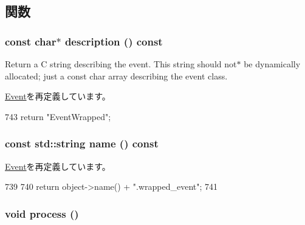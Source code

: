 \subsection{関数}
\hypertarget{classEventWrapper_a2bd90422eece9190794479e08092a252}{
\subsubsection[{description}]{\setlength{\rightskip}{0pt plus 5cm}const char$\ast$ description () const}}
\label{classEventWrapper_a2bd90422eece9190794479e08092a252}
Return a C string describing the event. This string should not$\ast$ be dynamically allocated; just a const char array describing the event class. 

\hyperlink{classEvent_a130ddddf003422b413e2e891b1b80e8f}{Event}を再定義しています。


\begin{DoxyCode}
743 { return "EventWrapped"; }
\end{DoxyCode}
\hypertarget{classEventWrapper_a6490f765a824ced1cc94979609fe7e07}{
\subsubsection[{name}]{\setlength{\rightskip}{0pt plus 5cm}const std::string name () const}}
\label{classEventWrapper_a6490f765a824ced1cc94979609fe7e07}


\hyperlink{classEvent_adbcff144e5e199d332a1352af1798148}{Event}を再定義しています。


\begin{DoxyCode}
739     {
740         return object->name() + ".wrapped_event";
741     }
\end{DoxyCode}
\hypertarget{classEventWrapper_a2e9c5136d19b1a95fc427e0852deab5c}{
\subsubsection[{process}]{\setlength{\rightskip}{0pt plus 5cm}void process ()}}
\label{classEventWrapper_a2e9c5136d19b1a95fc427e0852deab5c}


